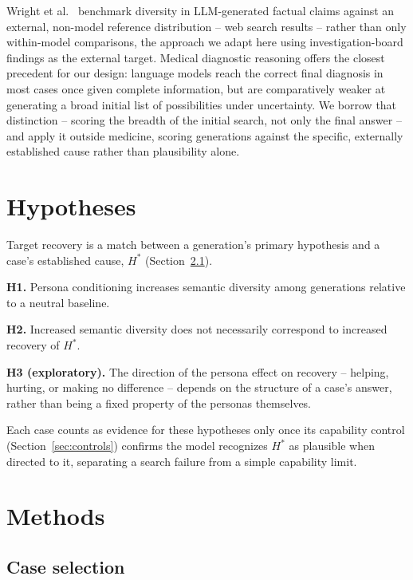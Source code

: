\documentclass[11pt]{article}
\newcommand{\hstar}{H^{*}}
\begin{document}
Wright et al.\ \citep{wright2025} benchmark diversity in LLM-generated
factual claims against an external, non-model reference distribution --
web search results -- rather than only within-model comparisons, the
approach we adapt here using investigation-board findings as the external
target. Medical diagnostic reasoning offers the closest precedent for our
design: language models reach the correct final diagnosis in most cases
once given complete information, but are comparatively weaker at
generating a broad initial list of possibilities under uncertainty. We
borrow that distinction -- scoring the breadth of the initial search, not
only the final answer -- and apply it outside medicine, scoring
generations against the specific, externally established cause rather
than plausibility alone.

\section{Hypotheses}
\label{sec:hypotheses}

Target recovery is a match between a generation's primary hypothesis and a
case's established cause, $\hstar$ (Section~\ref{sec:cases}).

\textbf{H1.} Persona conditioning increases semantic diversity among
generations relative to a neutral baseline.

\textbf{H2.} Increased semantic diversity does not necessarily correspond
to increased recovery of $\hstar$.

\textbf{H3 (exploratory).} The direction of the persona effect on recovery
-- helping, hurting, or making no difference -- depends on the structure of
a case's answer, rather than being a fixed property of the personas
themselves.

Each case counts as evidence for these hypotheses only once its capability
control (Section~\ref{sec:controls}) confirms the model recognizes $\hstar$
as plausible when directed to it, separating a search failure from a
simple capability limit.

\section{Methods}

\subsection{Case selection}
\label{sec:cases}
\end{document}
